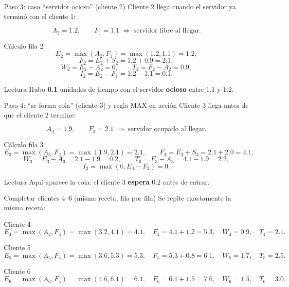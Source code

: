 \documentclass[aspectratio=1610, 9pt]{beamer}
\begin{document}
\begin{frame}{Paso 3: caso “servidor ocioso” (cliente 2)}
\small
Cliente 2 llega cuando el servidor ya terminó con el cliente 1:

\[
A_2=1.2,\qquad F_1=1.1 \;\Rightarrow\; \text{servidor libre al llegar}.
\]

\vspace{4pt}
\begin{block}{Cálculo fila 2}
\[
E_2=\max(A_2,F_1)=\max(1.2,1.1)=1.2,
\]
\[
F_2=E_2+S_2=1.2+0.9=2.1,
\]
\[
W_2=E_2-A_2=0,\qquad T_2=F_2-A_2=0.9,
\]
\[
I_2=E_2-F_1=1.2-1.1=0.1.
\]
\end{block}

\vspace{2pt}
\begin{alertblock}{Lectura}
Hubo \textbf{0.1} unidades de tiempo con el servidor \textbf{ocioso} entre $1.1$ y $1.2$.
\end{alertblock}
\end{frame}

\begin{frame}{Paso 4: “se forma cola” (cliente 3) y regla MAX en acción}
\small
Cliente 3 llega antes de que el cliente 2 termine:

\[
A_3=1.9,\qquad F_2=2.1 \;\Rightarrow\; \text{servidor ocupado al llegar}.
\]

\vspace{4pt}
\begin{block}{Cálculo fila 3}
\[
E_3=\max(A_3,F_2)=\max(1.9,2.1)=2.1,
\qquad
F_3=E_3+S_3=2.1+2.0=4.1,
\]
\[
W_3=E_3-A_3=2.1-1.9=0.2,
\qquad
T_3=F_3-A_3=4.1-1.9=2.2,
\]
\[
I_3=\max(0,E_3-F_2)=0.
\]
\end{block}

\vspace{2pt}
\begin{alertblock}{Lectura}
Aquí aparece la cola: el cliente 3 \textbf{espera} $0.2$ antes de entrar.
\end{alertblock}
\end{frame}

\begin{frame}{Completar clientes 4–6 (misma receta, fila por fila)}
\small
Se repite exactamente la misma receta:

\vspace{2pt}
\begin{block}{Cliente 4}
\[
E_4=\max(A_4,F_3)=\max(3.2,4.1)=4.1,\quad
F_4=4.1+1.2=5.3,\quad
W_4=0.9,\quad T_4=2.1.
\]
\end{block}

\vspace{2pt}
\begin{block}{Cliente 5}
\[
E_5=\max(A_5,F_4)=\max(3.6,5.3)=5.3,\quad
F_5=5.3+0.8=6.1,\quad
W_5=1.7,\quad T_5=2.5.
\]
\end{block}

\vspace{2pt}
\begin{block}{Cliente 6}
\[
E_6=\max(A_6,F_5)=\max(4.6,6.1)=6.1,\quad
F_6=6.1+1.5=7.6,\quad
W_6=1.5,\quad T_6=3.0.
\]
\end{block}

\end{frame}
\end{document}
